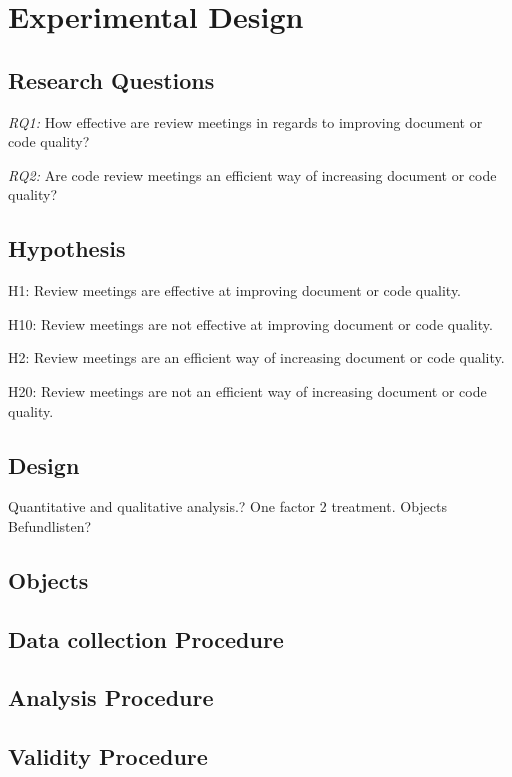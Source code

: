 \section{Experimental Design}

\subsection{Research Questions}

\textit{RQ1:} How effective are review meetings in regards to improving document or code quality?

\textit{RQ2:} Are code review meetings an efficient way of increasing document or code quality?



\subsection{Hypothesis}

H1: Review meetings are effective at improving document or code quality.

H10: Review meetings are not effective at improving document or code quality.

H2: Review meetings are an efficient way of increasing document or code quality.

H20: Review meetings are not an efficient way of increasing document or code quality.

\subsection{Design}

Quantitative and qualitative analysis.?
One factor 2 treatment.
Objects Befundlisten?


\subsection{Objects}

\subsection{Data collection Procedure}

\subsection{Analysis Procedure}

\subsection{Validity Procedure}